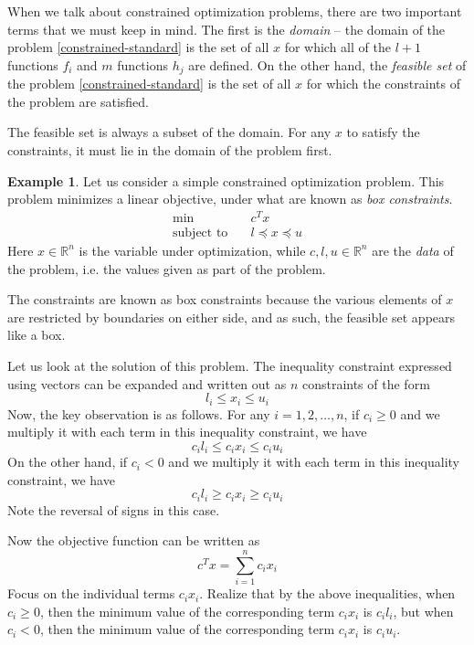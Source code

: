 \documentclass[a4paper]{article}
\theoremstyle{definition}
\newtheorem{example}{Example}[section]
\begin{document}
When we talk about constrained optimization problems, there are two important terms that we must keep in mind.
The first is the \textit{domain} -- the domain of the problem \eqref{constrained-standard} is the set of all $x$ for which all of the $l + 1$ functions $f_i$ and $m$ functions $h_j$ are defined.
On the other hand, the \textit{feasible set} of the problem \eqref{constrained-standard} is the set of all $x$ for which the constraints of the problem are satisfied.

The feasible set is always a subset of the domain.
For any $x$ to satisfy the constraints, it must lie in the domain of the problem first.

\begin{example}
	Let us consider a simple constrained optimization problem.
	This problem minimizes a linear objective, under what are known as \textit{box constraints}.
	\begin{align*}
		\min \quad & c^T x \\
		\text{subject to} \quad & l \preceq x \preceq u
	\end{align*}
	Here $x \in \mathbb{R}^n$ is the variable under optimization, while $c, l, u \in \mathbb{R}^n$ are the \textit{data} of the problem, i.e. the values given as part of the problem.

	The constraints are known as box constraints because the various elements of $x$ are restricted by boundaries on either side, and as such, the feasible set appears like a box.

	Let us look at the solution of this problem.
	The inequality constraint expressed using vectors can be expanded and written out as $n$ constraints of the form
	\begin{equation*}
		l_i \leq x_i \leq u_i
	\end{equation*}
	Now, the key observation is as follows.
	For any $i = 1, 2, \dots, n$, if $c_i \geq 0$ and we multiply it with each term in this inequality constraint, we have
	\begin{equation*}
		c_i l_i \leq c_i x_i \leq c_i u_i
	\end{equation*}
	On the other hand, if $c_i < 0$ and we multiply it with each term in this inequality constraint, we have
	\begin{equation*}
		c_i l_i \geq c_i x_i \geq c_i u_i
	\end{equation*}
	Note the reversal of signs in this case.

	Now the objective function can be written as
	\begin{equation*}
		c^T x = \sum_{i=1}^n c_i x_i
	\end{equation*}
	Focus on the individual terms $c_i x_i$.
	Realize that by the above inequalities, when $c_i \geq 0$, then the minimum value of the corresponding term $c_i x_i$ is $c_i l_i$, but when $c_i < 0$, then the minimum value of the corresponding term $c_i x_i$ is $c_i u_i$.


\end{example}
\end{document}
